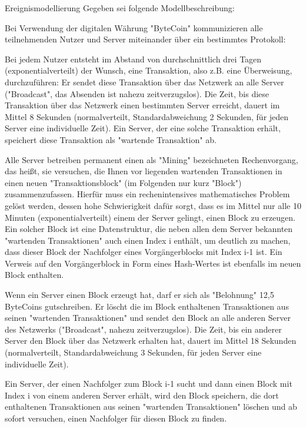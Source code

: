 \documentclass{article}
\begin{document}
\begin{exercise}{Ereignismodellierung}
  Gegeben sei folgende Modellbeschreibung:
  \par Bei Verwendung der digitalen Währung "ByteCoin" kommunizieren alle teilnehmenden Nutzer und Server miteinander über ein bestimmtes Protokoll:
  \par Bei jedem Nutzer entsteht im Abstand von durchschnittlich drei Tagen (exponentialverteilt) der Wunsch, eine Transaktion, also z.B. eine Überweisung, durchzuführen: Er sendet diese Transaktion über das Netzwerk an alle Server ("Broadcast", das Absenden ist nahezu zeitverzugslos). Die Zeit, bis diese Transaktion über das Netzwerk einen bestimmten Server erreicht, dauert im Mittel 8 Sekunden (normalverteilt, Standardabweichung 2 Sekunden, für jeden Server eine individuelle Zeit). Ein Server, der eine solche Transaktion erhält, speichert diese Transaktion als "wartende Transaktion" ab.
  \par Alle Server betreiben permanent einen als "Mining" bezeichneten Rechenvorgang, das heißt, sie versuchen, die Ihnen vor liegenden wartenden Transaktionen in einen neuen "Transaktionsblock" (im Folgenden nur kurz "Block") zusammenzufassen. Hierfür muss ein rechenintensives mathematisches Problem gelöst werden, dessen hohe Schwierigkeit dafür sorgt, dass es im Mittel nur alle 10 Minuten (exponentialverteilt) einem der Server gelingt, einen Block zu erzeugen. Ein solcher Block ist eine Datenstruktur, die neben allen dem Server bekannten "wartenden Transaktionen" auch einen Index i enthält, um deutlich zu machen, dass dieser Block der Nachfolger eines Vorgängerblocks mit Index i-1 ist. Ein Verweis auf den Vorgängerblock in Form eines Hash-Wertes ist ebenfalls im neuen Block enthalten.
  \par Wenn ein Server einen Block erzeugt hat, darf er sich als "Belohnung" 12,5 ByteCoins gutschreiben. Er löscht die im Block enthaltenen Transaktionen aus seinen "wartenden Transaktionen" und sendet den Block an alle anderen Server des Netzwerks ("Broadcast", nahezu zeitverzugslos). Die Zeit, bis ein anderer Server den Block über das Netzwerk erhalten hat, dauert im Mittel 18 Sekunden (normalverteilt, Standardabweichung 3 Sekunden, für jeden Server eine individuelle Zeit).
  \par Ein Server, der einen Nachfolger zum Block i-1 sucht und dann einen Block mit Index i von einem anderen Server erhält, wird den Block speichern, die dort enthaltenen Transaktionen aus seinen "wartenden Transaktionen" löschen und ab sofort versuchen, einen Nachfolger für diesen Block zu finden.


\end{exercise}
\end{document}
